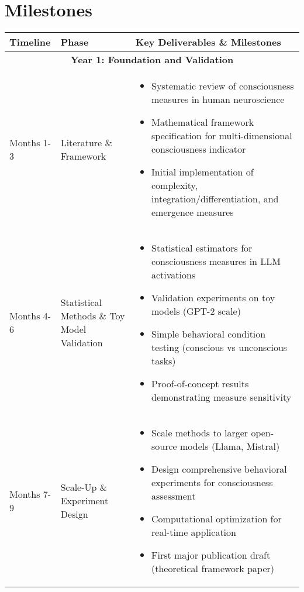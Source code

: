 \documentclass[11pt,a4paper]{article}
\begin{document}
\section{Milestones}
\begin{table}[h]
    \centering
    \begin{tabular}{|l|l|p{9cm}|}
    \hline
    \textbf{Timeline} & \textbf{Phase} & \textbf{Key Deliverables \& Milestones} \\
    \hline
    \multicolumn{3}{|c|}{\textbf{Year 1: Foundation and Validation}} \\
    \hline
    Months 1-3 & Literature \& Framework & 
    \begin{itemize}[leftmargin=*,noitemsep,topsep=0pt]
        \item Systematic review of consciousness measures in human neuroscience
        \item Mathematical framework specification for multi-dimensional consciousness indicator
        \item Initial implementation of complexity, integration/differentiation, and emergence measures
    \end{itemize} \\
    \hline
    Months 4-6 & Statistical Methods \& Toy Model Validation & 
    \begin{itemize}[leftmargin=*,noitemsep,topsep=0pt]
        \item Statistical estimators for consciousness measures in LLM activations
        \item Validation experiments on toy models (GPT-2 scale)
        \item Simple behavioral condition testing (conscious vs unconscious tasks)
        \item Proof-of-concept results demonstrating measure sensitivity
    \end{itemize} \\
    \hline
    Months 7-9 & Scale-Up \& Experiment Design & 
    \begin{itemize}[leftmargin=*,noitemsep,topsep=0pt]
        \item Scale methods to larger open-source models (Llama, Mistral)
        \item Design comprehensive behavioral experiments for consciousness assessment
        \item Computational optimization for real-time application
        \item First major publication draft (theoretical framework paper)
    \end{itemize} \\

\end{tabular}
\end{table}
\end{document}
